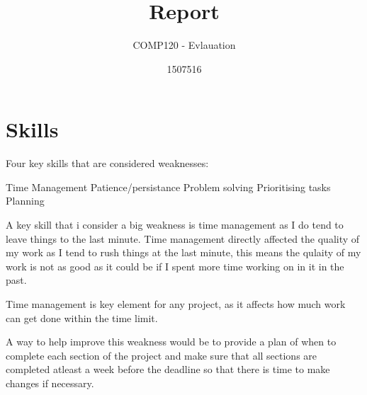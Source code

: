 \documentclass{scrartcl}
\title{Report}
\subtitle{COMP120 - Evlauation}
\author{1507516}
\begin{document}
\maketitle

\section{Skills}

Four key skills that are considered weaknesses:

Time Management
Patience/persistance
Problem solving
Prioritising tasks
Planning

A key skill that i consider a big weakness is time management as I do tend to leave things to the last minute. Time management directly affected the quality of my work as I tend to rush things at the last minute, this means the qulaity of my work is not as good as it could be if I spent more time working on in it in the past.

Time management is key element for any project, as it affects how much work can get done within the time limit. 

A way to help improve this weakness would be to provide a plan of when to complete each section of the project and make sure that all sections are completed atleast a week before the deadline so that there is time to make changes if necessary.
\end{document}
